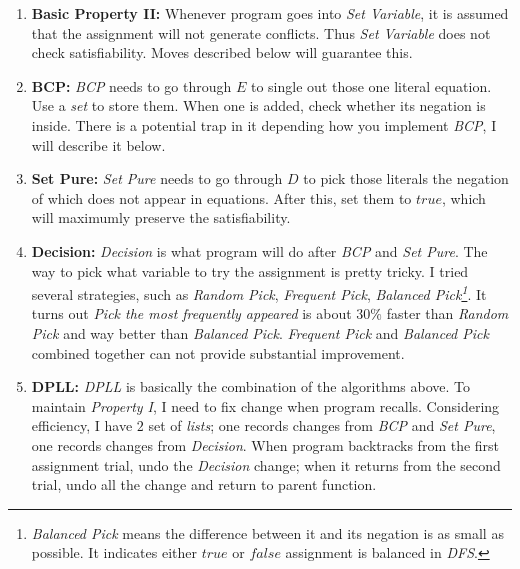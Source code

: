 \documentclass[a4paper,10pt]{article}
\begin{document}
\begin{enumerate}
\item \textbf{Basic Property II:} Whenever program goes into \textit{Set Variable}, it is 
    assumed that the assignment will not generate conflicts. Thus \textit{Set Variable} does
    not check satisfiability. Moves described below will guarantee this.
\item \textbf{BCP:} \textit{BCP} needs to go through $E$ to single out those one literal
    equation. Use a \textit{set} to store them. When one is added, check whether 
    its negation is inside. There is a potential trap in it depending how you implement 
    \textit{BCP}, I will describe it below.
\item \textbf{Set Pure:} \textit{Set Pure} needs to go through $D$ to pick those literals
    the negation of which does not appear in equations. After this, set them to $true$,
    which will maximumly preserve the satisfiability.
\item \textbf{Decision:} \textit{Decision} is what program will do after
    \textit{BCP} and \textit{Set Pure}. The way to pick what variable to try the assignment
    is pretty tricky. I tried several strategies,
    such as \textit{Random Pick}, \textit{Frequent
    Pick}, \textit{Balanced Pick\footnote{\textit{Balanced Pick} means
    the difference between it and its negation is as small as possible. It indicates either
    $true$ or $false$ assignment is balanced in \textit{DFS}.}}. It turns out
    \textit{Pick the most frequently appeared} is about $30\%$ faster than \textit{Random
    Pick} and way better than \textit{Balanced Pick}. 
    \textit{Frequent Pick} and \textit{Balanced Pick} combined together
    can not provide substantial improvement. 
\item \textbf{DPLL:} \textit{DPLL} is basically the combination of the algorithms above. 
    To maintain \textit{Property I}, I need to fix change when program recalls.
    Considering
    efficiency, I have $2$ set of \textit{lists}; one records changes from \textit{BCP} and
    \textit{Set Pure}, one records changes from \textit{Decision}. When program backtracks
    from the first assignment trial,
    undo the \textit{Decision} change; when it returns from 
    the second trial, undo all the change and return to parent function.
\end{enumerate}
\end{document}
